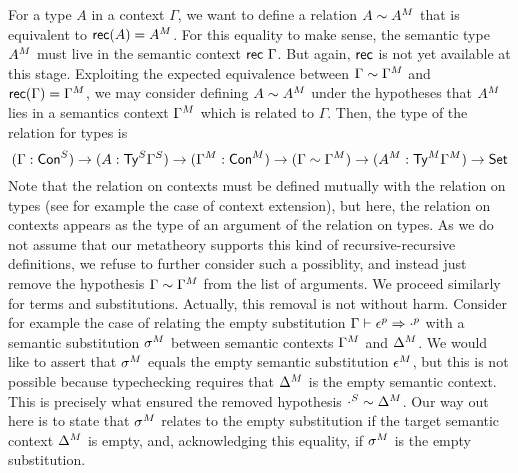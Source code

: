 For a type $A$ in a context $\Gamma$, we want to define a relation
$A\sim {A}^M$ that is equivalent to $\mathsf{rec}(A)={A}^M$.
For this equality to make sense, the semantic type ${A}^M$ must live
in the semantic context $\mathsf{rec}\ \Gamma$. But again, $\mathsf{rec}$ is not
yet available at this stage. Exploiting the expected equivalence between
$\Gamma\sim{\Gamma}^M$ and $\mathsf{rec}(\Gamma)={\Gamma}^M$, we may consider defining $A\sim{A}^M$ under the
hypotheses that ${A}^M$ lies in a semantics context ${\Gamma}^M$ which is
related to $\Gamma$. Then, the type of the relation for types is
\[
  (\Gamma : {\mathsf{Con}}^S)\rightarrow (A : {\mathsf{Ty}}^S{\Gamma}^S) \rightarrow
  ({\Gamma}^M : {\mathsf{Con}}^M)
  \rightarrow
  (\Gamma \sim {\Gamma}^M)
  \rightarrow
  ({A}^M:{\mathsf{Ty}}^M{\Gamma}^M)
  \rightarrow
  \mathsf{Set}
\]
Note that the relation on contexts
must be defined mutually with the relation on types (see for example the case of
context extension), but here, the relation on contexts appears as the type of an
argument of the relation on types.
As we do not assume that our metatheory
supports this kind of recursive-recursive definitions, we refuse to further consider
 such a possiblity, and instead just remove the 
hypothesis $\Gamma\sim{\Gamma}^M$ from the list of arguments.
We proceed similarly for terms and substitutions. Actually, 
this removal is not without harm. Consider for example the case of relating the
empty substitution $\Gamma\vdash {\epsilon}^p \Rightarrow {\cdot}^p $
with a semantic substitution ${\sigma}^M$ between semantic contexts
${\Gamma}^M$ and ${\Delta}^M$. We would like to assert that ${\sigma}^M$
equals the empty semantic substitution ${\epsilon}^M$, but this is not
possible because typechecking requires that ${\Delta}^M$ is 
the empty semantic context. This is precisely what ensured the removed hypothesis
${\cdot}^S \sim {\Delta}^M$.
Our way out here is to state that ${\sigma}^M$ relates to the empty
substitution if the target semantic context ${\Delta}^M$ is empty, and, acknowledging
this equality, if ${\sigma}^M$ is
the empty substitution.

